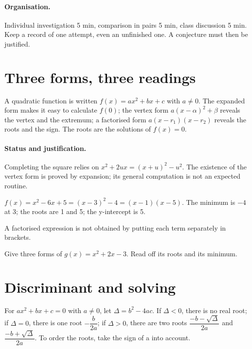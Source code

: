 \paragraph{Organisation.} Individual investigation 5 min, comparison in pairs 5 min, class discussion 5 min. Keep a record of one attempt, even an unfinished one. A conjecture must then be justified.
\mxnewpage
\section{Three forms, three readings}\label{C02-U1}
\begin{keypoint}
A quadratic function is written $f(x)=ax^2+bx+c$ with $a\ne0$. The expanded form makes it easy to calculate $f(0)$; the vertex form $a(x-\alpha)^2+\beta$ reveals the vertex and the extremum; a factorised form $a(x-r_1)(x-r_2)$ reveals the roots and the sign. The roots are the solutions of $f(x)=0$.
\end{keypoint}
\paragraph{Status and justification.} Completing the square relies on $x^2+2ux=(x+u)^2-u^2$. The existence of the vertex form is proved by expansion; its general computation is not an expected routine.
\begin{example}$f(x)=x^2-6x+5=(x-3)^2-4=(x-1)(x-5)$. The minimum is $-4$ at 3; the roots are 1 and 5; the y-intercept is 5.\end{example}\label{C02-EX1}
\begin{pitfall}A factorised expression is not obtained by putting each term separately in brackets.\end{pitfall}
\begin{application}Give three forms of $g(x)=x^2+2x-3$. Read off its roots and its minimum.\end{application}\label{C02-AP1}
\section{Discriminant and solving}\label{C02-U2}
\begin{keypoint}
For $ax^2+bx+c=0$ with $a\ne0$, let $\Delta=b^2-4ac$. If $\Delta<0$, there is no real root; if $\Delta=0$, there is one root $-\dfrac{b}{2a}$; if $\Delta>0$, there are two roots $\dfrac{-b-\sqrt\Delta}{2a}$ and $\dfrac{-b+\sqrt\Delta}{2a}$. To order the roots, take the sign of a into account.
\end{keypoint}
